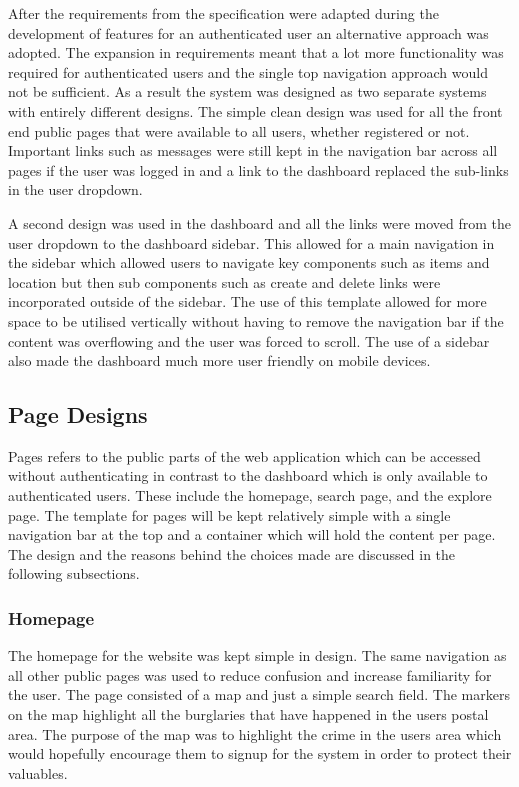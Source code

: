 After the requirements from the specification were adapted during the development of features for an authenticated user an alternative approach was adopted. The expansion in requirements meant that a lot more functionality was required for authenticated users and the single top navigation approach would not be sufficient. As a result the system was designed as two separate systems with entirely different designs. The simple clean design was used for all the front end public pages that were available to all users, whether registered or not. Important links such as messages were still kept in the navigation bar across all pages if the user was logged in and a link to the dashboard replaced the sub-links in the user dropdown.

A second design was used in the dashboard and all the links were moved from the user dropdown to the dashboard sidebar. This allowed for a main navigation in the sidebar which allowed users to navigate key components such as items and location but then sub components such as create and delete links were incorporated outside of the sidebar. The use of this template allowed for more space to be utilised vertically without having to remove the navigation bar if the content was overflowing and the user was forced to scroll. The use of a sidebar also made the dashboard much more user friendly on mobile devices.

\subsection{Page Designs}
Pages refers to the public parts of the web application which can be accessed without authenticating in contrast to the dashboard which is only available to authenticated users. These include the homepage, search page, and the explore page. The template for pages will be kept relatively simple with a single navigation bar at the top and a container which will hold the content per page. The design and the reasons behind the choices made are discussed in the following subsections.

\subsubsection{Homepage}
The homepage for the website was kept simple in design. The same navigation as all other public pages was used to reduce confusion and increase familiarity for the user. The page consisted of a map and just a simple search field. The markers on the map highlight all the burglaries that have happened in the users postal area. The purpose of the map was to highlight the crime in the users area which would hopefully encourage them to signup for the system in order to protect their valuables.

